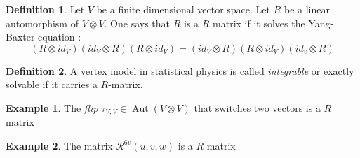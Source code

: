 \documentclass{article}
\DeclareMathOperator{\aut}{Aut}
\theoremstyle{definition}
\newtheorem{ex}{Example}[section]
\newtheorem{Def}{Definition}[section]
\begin{document}
\begin{Def} Let $V$ be a finite dimensional vector space. Let $R$ be a linear automorphism of $V\otimes V$. One says that $R$ is a $R$ matrix if it solves the Yang-Baxter equation : $$(R\otimes id_{V})(id_{V}\otimes R)(R\otimes id_{V})=(id_{V}\otimes R)(R\otimes id_{V})(id_{v}\otimes R)$$
\end{Def}
\begin{Def} A vertex model in statistical physics is called \textit{integrable} or exactly solvable if it carries a $R$-matrix.
\end{Def}
\begin{ex} The \textit{flip} $\tau_{V,V}\in\aut(V\otimes V)$ that switches two vectors is a $R$ matrix
\end{ex}
\begin{ex} The matrix $\mathcal{R}^{6v}(u,v,w)$ is a $R$ matrix
\end{ex} 
\end{document}
